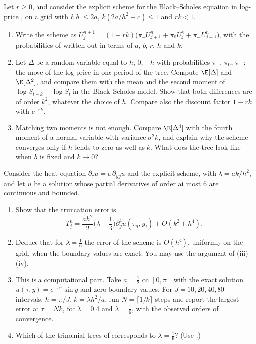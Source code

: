 \begin{exercise}\label{ex:num-trinomial}
\easy Let $r\ge0$, and consider the explicit scheme for the Black--Scholes equation in log-price
, on a grid with $h|b|\le2a$, $k(2a/h^2+c)\le1$ and $rk<1$.
\begin{enumerate}[label=(\alph*)]
  \item Write the scheme as $U^{n+1}_j=(1-rk)\big(\pi_+U^n_{j+1}+\pi_0U^n_j+\pi_-U^n_{j-1}\big)$, with the
    probabilities of  written out in terms of $a$, $b$, $r$, $h$ and $k$.
  \item Let $\Delta$ be a random variable equal to $h$, $0$, $-h$ with probabilities $\pi_+$, $\pi_0$,
    $\pi_-$: the move of the log-price in one period of the tree. Compute $\E[\Delta]$ and $\E[\Delta^2]$, and
    compare them with the mean and the second moment of $\log S_{t+k}-\log S_t$ in the Black--Scholes model.
    Show that both differences are of order $k^2$, whatever the choice of $h$. Compare also the discount
    factor $1-rk$ with $e^{-rk}$.
  \item Matching two moments is not enough. Compare $\E[\Delta^4]$ with the fourth moment of a normal
    variable with variance $\sigma^2k$, and explain why the scheme converges only if $h$ tends to zero
    as well as $k$. What does the tree look like when $h$ is fixed and $k\to0$?
\end{enumerate}
\end{exercise}

\begin{exercise}\label{ex:num-truncation}
\medium Consider the heat equation $\partial_\tau u=a\,\partial_{yy}u$ and the explicit scheme, with
$\lambda=ak/h^2$, and let $u$ be a solution whose partial derivatives of order at most $6$ are
continuous and bounded.
\begin{enumerate}[label=(\alph*)]
  \item Show that the truncation error is
    \[
      T^n_j=\frac{ah^2}2\Big(\lambda-\frac16\Big)\partial^4_yu(\tau_n,y_j)+O(k^2+h^4).
    \]
  \item Deduce that for $\lambda=\frac16$ the error of the scheme is $O(h^4)$, uniformly on the grid,
    when the boundary values are exact. You may use the argument of (iii)--(iv).
  \item This is a computational part. Take $a=\frac12$ on $[0,\pi]$ with the exact solution
    $u(\tau,y)=e^{-a\tau}\sin y$ and zero boundary values. For $J=10,20,40,80$ intervals, $h=\pi/J$,
    $k=\lambda h^2/a$, run $N=\lceil1/k\rceil$ steps and report the largest error at $\tau=Nk$, for
    $\lambda=0.4$ and $\lambda=\frac16$, with the observed orders of convergence.
  \item Which of the trinomial trees of  corresponds to
    $\lambda=\frac16$? (Use .)
\end{enumerate}
\end{exercise}


